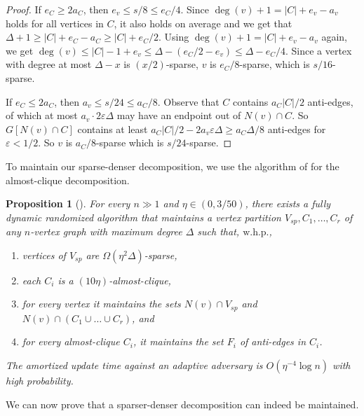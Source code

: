 \documentclass[a4paper,english,11pt]{amsart}
\newtheorem{proposition}[lemma]{Proposition}
\theoremstyle{definition}
\renewcommand{\leq}{\leqslant}
\renewcommand{\geq}{\geqslant}
\newcommand{\eps}{\varepsilon}
\newcommand{\whp}{$\text{w.h.p.}$\xspace}
\newcommand{\Vsparse}{V_{sp}}
\newcommand{\hateps}{\eta}
\begin{document}
\begin{proof}
    If $e_C \geq 2a_C$, then $e_v \leq s/8 \leq e_C/4$. Since $\deg(v) +1 = |C| + e_v - a_v$ holds for all vertices in $C$, it also holds on average and we get that $\Delta + 1 \geq |C| + e_C - a_C \geq |C| + e_C/2$. Using $\deg(v)+1 = |C| + e_v - a_v$ again, we get $\deg(v) \leq |C| - 1 + e_v \leq \Delta - (e_C/2 - e_v) \leq \Delta - e_C/4$. Since a vertex with degree at most $\Delta - x$ is $(x/2)$-sparse, $v$ is $e_C/8$-sparse, which is $s/16$-sparse.

    If $e_C \leq 2a_C$, then $a_v \leq s/24 \leq a_C/8$. Observe that $C$ contains $a_C|C|/2$ anti-edges, of which at most $a_v \cdot 2\eps\Delta$ may have an endpoint out of $N(v) \cap C$. So $G[N(v) \cap C]$ contains at least $a_C|C|/2 - 2 a_v \eps\Delta \geq a_C\Delta/8$ anti-edges for $\eps < 1/2$. So $v$ is $a_C/8$-sparse which is $s/24$-sparse.
\end{proof}

To maintain our sparse-denser decomposition, we use the algorithm of \cite{BRW24} for the almost-clique decomposition.

\begin{proposition}[{\cite[Theorem 4.1]{BRW24}}]
    \label{prop:acd}
    For every $n \gg 1$ and $\hateps \in (0, 3/50)$, there exists a fully dynamic randomized algorithm that maintains a vertex partition $\Vsparse, C_1, \ldots, C_r$ of any $n$-vertex graph with maximum degree $\Delta$ such that, \whp,
    \begin{enumerate}
        \item vertices of $\Vsparse$ are $\Omega( \hateps^2\Delta )$-sparse,
        \item each $C_i$ is a $(10 \hateps)$-almost-clique,
        \item for every vertex it maintains the sets $N(v) \cap \Vsparse$ and $N(v) \cap (C_1 \cup \ldots \cup C_r)$, and
        \item for every almost-clique $C_i$, it maintains the set $F_i$ of anti-edges in $C_i$.
    \end{enumerate}
   The amortized update time against an adaptive adversary is $O(\hateps^{-4}\log n)$ with high probability.
\end{proposition}

We can now prove that a sparser-denser decomposition can indeed be maintained.
\end{document}
